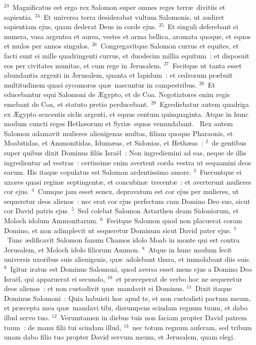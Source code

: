 ${}^{23}$~Magnificatus est ergo rex Salomon super omnes reges terr\ae\ divitiis et sapientia.
${}^{24}$~Et universa terra desiderabat vultum Salomonis, ut audiret sapientiam ejus, quam dederat Deus in corde ejus.
${}^{25}$~Et singuli deferebant ei munera, vasa argentea et aurea, vestes et arma bellica, aromata quoque, et equos et mulos per annos singulos.
${}^{26}$~Congregavitque Salomon currus et equites, et facti sunt ei mille quadringenti currus, et duodecim millia equitum~: et disposuit eos per civitates munitas, et cum rege in Jerusalem.
${}^{27}$~Fecitque ut tanta esset abundantia argenti in Jerusalem, quanta et lapidum~: et cedrorum pr\ae buit multitudinem quasi sycomoros qu\ae\ nascuntur in campestribus.
${}^{28}$~Et educebantur equi Salomoni de \AE gypto, et de Coa. Negotiatores enim regis emebant de Coa, et statuto pretio perducebant.
${}^{29}$~Egrediebatur autem quadriga ex \AE gypto sexcentis siclis argenti, et equus centum quinquaginta. Atque in hunc modum cuncti reges Heth\ae orum et Syri\ae\ equos venundabant.
~Rex autem Salomon adamavit mulieres alienigenas multas, filiam quoque Pharaonis, et Moabitidas, et Ammonitidas, Idum\ae as, et Sidonias, et Heth\ae as~:
${}^{2}$~de gentibus super quibus dixit Dominus filiis Isra\"el~: Non ingrediemini ad eas, neque de illis ingredientur ad vestras~: certissime enim avertent corda vestra ut sequamini deos earum. His itaque copulatus est Salomon ardentissimo amore.
${}^{3}$~Fueruntque ei uxores quasi regin\ae\ septingent\ae , et concubin\ae\ trecent\ae~: et averterunt mulieres cor ejus.
${}^{4}$~Cumque jam esset senex, depravatum est cor ejus per mulieres, ut sequeretur deos alienos~: nec erat cor ejus perfectum cum Domino Deo suo, sicut cor David patris ejus.
${}^{5}$~Sed colebat Salomon Astarthen deam Sidoniorum, et Moloch idolum Ammonitarum.
${}^{6}$~Fecitque Salomon quod non placuerat coram Domino, et non adimplevit ut sequeretur Dominum sicut David pater ejus.
${}^{7}$~Tunc \ae dificavit Salomon fanum Chamos idolo Moab in monte qui est contra Jerusalem, et Moloch idolo filiorum Ammon.
${}^{8}$~Atque in hunc modum fecit universis uxoribus suis alienigenis, qu\ae\ adolebant thura, et immolabant diis suis.
${}^{9}$~Igitur iratus est Dominus Salomoni, quod aversa esset mens ejus a Domino Deo Isra\"el, qui apparuerat ei secundo,
${}^{10}$~et pr\ae ceperat de verbo hoc ne sequeretur deos alienos~: et non custodivit qu\ae\ mandavit ei Dominus.
${}^{11}$~Dixit itaque Dominus Salomoni~: Quia habuisti hoc apud te, et non custodisti pactum meum, et pr\ae cepta mea qu\ae\ mandavi tibi, disrumpens scindam regnum tuum, et dabo illud servo tuo.
${}^{12}$~Verumtamen in diebus tuis non faciam propter David patrem tuum~: de manu filii tui scindam illud,
${}^{13}$~nec totum regnum auferam, sed tribum unam dabo filio tuo propter David servum meum, et Jerusalem, quam elegi.


